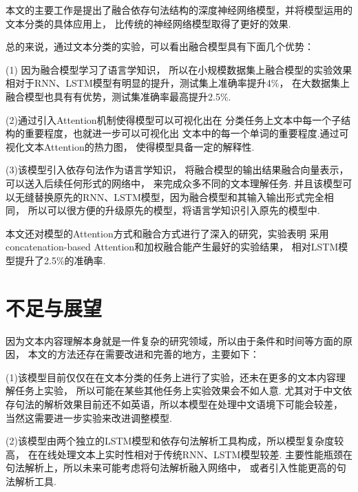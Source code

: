 \documentclass[bachelor,winfonts]{jnuthesis}
\begin{document}
本文的主要工作是提出了融合依存句法结构的深度神经网络模型，并将模型运用的文本分类的具体应用上，
比传统的神经网络模型取得了更好的效果.

总的来说，通过文本分类的实验，可以看出融合模型具有下面几个优势：

(1) 因为融合模型学习了语言学知识，
所以在小规模数据集上融合模型的实验效果相对于RNN、LSTM模型有明显的提升，测试集上准确率提升4\%，
在大数据集上融合模型也具有有优势，测试集准确率最高提升2.5\%.

(2)通过引入Attention机制使得模型可以可视化出在
分类任务上文本中每一个子结构的重要程度，也就进一步可以可视化出
文本中的每一个单词的重要程度.通过可视化文本Attention的热力图，
使得模型具备一定的解释性.

(3)该模型引入依存句法作为语言学知识，
将融合模型的输出结果融合向量表示，可以送入后续任何形式的网络中，
来完成众多不同的文本理解任务.
并且该模型可以无缝替换原先的RNN、LSTM模型，因为融合模型和其输入输出形式完全相同，
所以可以很方便的升级原先的模型，将语言学知识引入原先的模型中.

本文还对模型的Attention方式和融合方式进行了深入的研究，实验表明
采用concatenation-based Attention和加权融合能产生最好的实验结果，
相对LSTM模型提升了2.5\%的准确率.

\section{不足与展望}
因为文本内容理解本身就是一件复杂的研究领域，所以由于条件和时间等方面的原因，
本文的方法还存在需要改进和完善的地方，主要如下：

(1)该模型目前仅仅在在文本分类的任务上进行了实验，还未在更多的文本内容理解任务上实验，
所以可能在某些其他任务上实验效果会不如人意.
尤其对于中文依存句法的解析效果目前还不如英语，所以本模型在处理中文语境下可能会较差，
当然这需要进一步实验来改进调整模型.

(2)该模型由两个独立的LSTM模型和依存句法解析工具构成，所以模型复杂度较高，
在在线处理文本上实时性相对于传统RNN、LSTM模型较差.
主要性能瓶颈在句法解析上，所以未来可能考虑将句法解析融入网络中，
或者引入性能更高的句法解析工具.


\nocite{*}

%
%

\begin{acknowledgement}
  
\end{acknowledgement}

\backmatter




\end{document}
